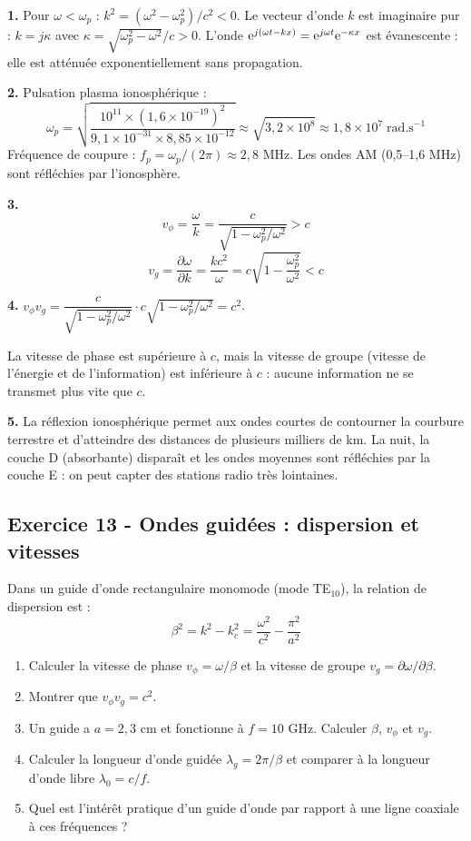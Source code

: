 \documentclass[12pt,a4paper]{article}
\begin{document}
\begin{boitecorrige}
\textbf{1.} Pour $\omega < \omega_p$ : $k^2 = (\omega^2-\omega_p^2)/c^2 < 0$. Le vecteur d'onde $k$ est imaginaire pur : $k = j\kappa$ avec $\kappa = \sqrt{\omega_p^2-\omega^2}/c > 0$. L'onde $\mathrm{e}^{j(\omega t - kx)} = \mathrm{e}^{j\omega t}\mathrm{e}^{-\kappa x}$ est évanescente : elle est atténuée exponentiellement sans propagation.

\textbf{2.} Pulsation plasma ionosphérique :
\[
\omega_p = \sqrt{\frac{10^{11}\times(1{,}6\times10^{-19})^2}{9{,}1\times10^{-31}\times8{,}85\times10^{-12}}}\approx\sqrt{3{,}2\times10^{8}}\approx 1{,}8\times10^7\;\text{rad.s}^{-1}
\]
Fréquence de coupure : $f_p = \omega_p/(2\pi)\approx 2{,}8$ MHz. Les ondes AM (0{,}5--1{,}6 MHz) sont réfléchies par l'ionosphère.

\textbf{3.}
\[
v_\phi = \frac{\omega}{k} = \frac{c}{\sqrt{1-\omega_p^2/\omega^2}} > c
\]
\[
v_g = \frac{\partial\omega}{\partial k} = \frac{kc^2}{\omega} = c\sqrt{1-\frac{\omega_p^2}{\omega^2}} < c
\]

\textbf{4.} $v_\phi v_g = \dfrac{c}{\sqrt{1-\omega_p^2/\omega^2}}\cdot c\sqrt{1-\omega_p^2/\omega^2} = c^2$.

La vitesse de phase est supérieure à $c$, mais la vitesse de groupe (vitesse de l'énergie et de l'information) est inférieure à $c$ : aucune information ne se transmet plus vite que $c$.

\textbf{5.} La réflexion ionosphérique permet aux ondes courtes de contourner la courbure terrestre et d'atteindre des distances de plusieurs milliers de km. La nuit, la couche D (absorbante) disparaît et les ondes moyennes sont réfléchies par la couche E : on peut capter des stations radio très lointaines.
\end{boitecorrige}

\subsection*{Exercice 13 - Ondes guidées : dispersion et vitesses \niveau{\moyen}}

\begin{boiteexercice}
Dans un guide d'onde rectangulaire monomode (mode TE$_{10}$), la relation de dispersion est :
\[
\beta^2 = k^2 - k_c^2 = \frac{\omega^2}{c^2} - \frac{\pi^2}{a^2}
\]
\begin{enumerate}
  \item Calculer la vitesse de phase $v_\phi = \omega/\beta$ et la vitesse de groupe $v_g = \partial\omega/\partial\beta$.
  \item Montrer que $v_\phi v_g = c^2$.
  \item Un guide a $a = 2{,}3$ cm et fonctionne à $f = 10$ GHz. Calculer $\beta$, $v_\phi$ et $v_g$.
  \item Calculer la longueur d'onde guidée $\lambda_g = 2\pi/\beta$ et comparer à la longueur d'onde libre $\lambda_0 = c/f$.
  \item Quel est l'intérêt pratique d'un guide d'onde par rapport à une ligne coaxiale à ces fréquences ?
\end{enumerate}
\end{boiteexercice}
\end{document}

